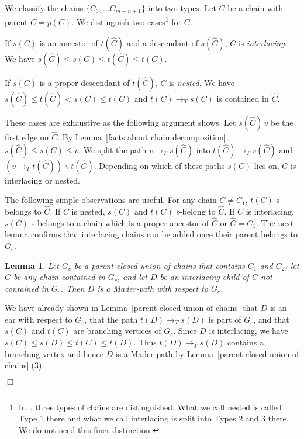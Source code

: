 \documentclass[paper=a4]{scrartcl}
\newtheorem{lemma}{Lemma}
\newcommand{\qed}{}
\newcommand{\mqed}{\hfill$\Box$}
\newlength{\proofpostskipamount}\newlength{\proofpreskipamount}
\newenvironment{proof}{\par\vspace{\proofpreskipamount}\noindent{\textbf{Proof:}}\hspace{0.5em}}{\nopagebreak \strut\nopagebreak \hspace{\fill}\mqed\par\vspace{\proofpostskipamount}\noindent}
\newcommand{\pC}{\widehat{C}}
\newcommand{\edge}[2]{\ensuremath{#1\,#2}}
\begin{document}
We classify the chains $\{C_3,\ldots C_{m-n+1}\}$ into two types. Let $C$ be a chain with parent $\pC = p(C)$. We distinguish two cases\footnote{In~\cite{Schmidt2013}, three types of chains are distinguished. What we call nested is called Type 1 there and what we call interlacing is split into Types 2 and 3 there. We do not need this finer distinction.} for $C$.
\begin{compactitem}
	\item If $s(C)$ is an ancestor of $t(\pC)$ and a descendant of $s(\pC)$, $C$ is \emph{interlacing}. We have $s(\pC)\le s(C)\le t(\pC)\le t(C)$.
	\item If $s(C)$ is a proper descendant of $t(\pC)$, $C$ is \emph{nested}. We have $s(\pC) \le t(\pC) < s(C) \le t(C)$ and $t(C)\rightarrow_T s(C)$ is contained in $\pC$.
\end{compactitem}
These cases are exhaustive as the following argument shows. Let $\edge{s(\pC)}{v}$ be the first edge on $\pC$. By Lemma~\ref{facts about chain decomposition}, $s(\pC) \le s(C) \le v$. We split the path $v\rightarrow_T s(\pC)$ into $t(\pC)\rightarrow _T s(\pC)$ and $(v\rightarrow_T t(\pC))\backslash t(\pC)$. Depending on which of these paths $s(C)$ lies on, $C$ is interlacing or nested.

The following simple observations are useful. For any chain $C \neq C_1$, $t(C)$ s-belongs to $\pC$. If $C$ is nested, $s(C)$ and $t(C)$ s-belong to $\pC$. If $C$ is interlacing, $s(C)$ s-belongs to a chain which is a proper ancestor of $\pC$ or $\pC = C_1$. The next lemma confirms that interlacing chains can be added once their parent belongs to $G_c$.

\begin{lemma}\label{interlacing are easy}
Let $G_c$ be a parent-closed union of chains that contains $C_1$ and $C_2$, let $C$ be any chain contained in $G_c$, and let $D$ be an interlacing child of $C$ not contained in $G_c$. Then $D$ is a Mader-path with respect to $G_c$.
\end{lemma}
\begin{proof} We have already shown in Lemma~\ref{parent-closed union of chains} that $D$ is an ear with respect to $G_c$, that the path $t(D) \rightarrow_T s(D)$ is part of $G_c$, and that $s(C)$ and $t(C)$ are branching vertices of $G_c$. Since $D$ is interlacing, we have $s(C) \le s(D) \le t(C) \le t(D)$. Thus $t(D) \rightarrow_T s(D)$ contains a branching vertex and hence $D$ is a Mader-path by Lemma~\ref{parent-closed union of chains}.(3). \qed
\end{proof}
\end{document}
